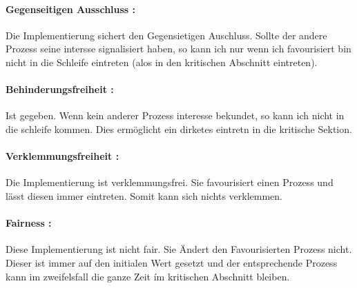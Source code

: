 \paragraph{ Gegenseitigen Ausschluss : } Die Implementierung sichert den Gegensietigen Auschluss. Sollte der andere Prozess seine intersse signalisiert haben, so kann ich nur wenn ich favourisiert bin nicht in die Schleife eintreten (alos in den kritischen Abschnitt eintreten).


\paragraph{ Behinderungsfreiheit : } Ist gegeben. Wenn kein anderer Prozess interesse bekundet, so kann ich nicht in die schleife kommen. Dies ermöglicht ein dirketes eintretn in die kritische Sektion.


\paragraph{ Verklemmungsfreiheit : } Die Implementierung ist verklemmungsfrei. Sie favourisiert einen Prozess und lässt diesen immer eintreten. Somit kann sich nichts verklemmen.


\paragraph{ Fairness : } Diese Implementierung ist nicht fair. Sie Ändert den Favourisierten Prozess nicht. Dieser ist immer auf den initialen Wert gesetzt und der entsprechende Prozess kann im zweifelsfall die ganze Zeit ím kritischen Abschnitt bleiben.
